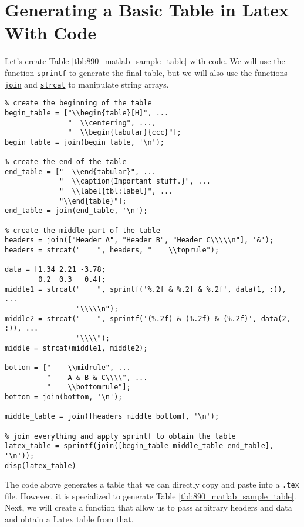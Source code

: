 \documentclass[12pt, a4paper]{article}
\begin{document}
\section{Generating a Basic Table in Latex With Code}
\label{sec:org5978867}
Let's create Table \ref{tbl:890_matlab_sample_table} with code.
We will use the function \texttt{sprintf} to generate the final table, but we will also use the functions \href{https://www.mathworks.com/help/matlab/ref/matlab.unittest.diagnostics.diagnostic.join.html?s\_tid=doc\_ta}{\texttt{join}} and \href{https://www.mathworks.com/help/matlab/ref/strcat.html?s\_tid=doc\_ta}{\texttt{strcat}} to manipulate string arrays.
\lstset{language=matlab,label= ,caption= ,captionpos=b,firstnumber=1,numbers=left,style=Matlab-editor}
\begin{lstlisting}
% create the beginning of the table
begin_table = ["\\begin{table}[H]", ...
               "  \\centering", ...,
               "  \\begin{tabular}{ccc}"];
begin_table = join(begin_table, '\n');

% create the end of the table
end_table = ["  \\end{tabular}", ...
             "  \\caption{Important stuff.}", ...
             "  \\label{tbl:label}", ...
             "\\end{table}"];
end_table = join(end_table, '\n');

% create the middle part of the table
headers = join(["Header A", "Header B", "Header C\\\\\n"], '&');
headers = strcat("    ", headers, "    \\toprule");

data = [1.34 2.21 -3.78;
        0.2  0.3   0.4];
middle1 = strcat("    ", sprintf('%.2f & %.2f & %.2f', data(1, :)), ...
                 "\\\\\n");
middle2 = strcat("    ", sprintf('(%.2f) & (%.2f) & (%.2f)', data(2, :)), ...
                 "\\\\");
middle = strcat(middle1, middle2);

bottom = ["    \\midrule", ...
          "    A & B & C\\\\", ...
          "    \\bottomrule"];
bottom = join(bottom, '\n');

middle_table = join([headers middle bottom], '\n');

% join everything and apply sprintf to obtain the table
latex_table = sprintf(join([begin_table middle_table end_table], '\n'));
disp(latex_table)
\end{lstlisting}
The code above generates a table that we can directly copy and paste into a \texttt{.tex} file.
However, it is specialized to generate Table \ref{tbl:890_matlab_sample_table}.
Next, we will create a function that allow us to pass arbitrary headers and data and obtain a Latex table from that.
\end{document}
